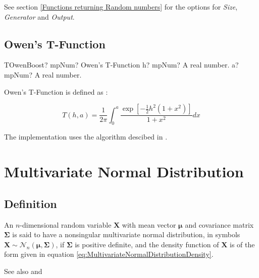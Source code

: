 \vspace{0.3cm}

See section \ref{Functions returning Random numbers} for the options for  {\itshape\sffamily Size},  {\itshape\sffamily Generator} and {\itshape\sffamily Output}. 


\subsection{Owen's T-Function}
\label{sec:OwenTFunction}


\begin{mpFunctionsExtract}
	\mpFunctionTwo
	{TOwenBoost? mpNum? Owen's T-Function}
	{h? mpNum? A real number.}
	{a? mpNum? A real number.}
\end{mpFunctionsExtract}

\vspace{0.3cm}
Owen's T-Function is defined as \citep{owen_1956}:

\begin{equation}
	T(h,a) = \frac{1}{2\pi} \int_0^a \frac{\exp \left[-\tfrac{1}{2} h^2 (1+x^2)\right]}{1+x^2} dx
\end{equation}

The implementation uses the algorithm descibed in \cite{patefield_2000}.





\newpage
\section{Multivariate Normal Distribution}


\subsection{Definition}
\label{MultivariateNormalDistributionDefinition}
An $n$-dimensional random variable $\textbf{X}$ with mean vector $\boldsymbol{\mu}$ and covariance matrix  $\boldsymbol{\Sigma}$ is said to have a nonsingular multivariate normal distribution, in symbols $\boldsymbol{X}  \sim \mathcal{N}_n(\boldsymbol{\mu}, \boldsymbol{\Sigma})$, if  $\boldsymbol{\Sigma}$ is positive definite, and the density function of $\textbf{X}$ is of the form given in equation \ref{eq:MultivariateNormalDistributionDensity}.

See also \cite{Steck_1962}and \cite{owen_moments_1962}

